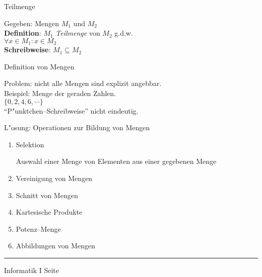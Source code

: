 
\begin{slide}{}
\normalsize
\begin{center}
Teilmenge 
\end{center}
\vspace{0.5cm}

\footnotesize
Gegeben: Mengen $M_1$ und $M_2$ \\[0.3cm]
\textbf{Definition}: $M_1$ \emph{Teilmenge} von $M_2$ g.d.w. \\[0.3cm]
\hspace*{1.3cm} $\forall x \in M_1: x \in M_2$ \\[0.3cm]
\textbf{Schreibweise}: $M_1 \subseteq M_2$


\normalsize
\begin{center}
Definition von Mengen 
\end{center}
\vspace{0.5cm}

\footnotesize
Problem: nicht alle Mengen sind explizit angebbar.  \\
Beispiel: Menge der geraden Zahlen. \\[0.3cm]
\hspace*{1.3cm} $\{0, 2, 4, 6, \cdots \}$ \\[0.3cm]
``P"unktchen--Schreibweise'' nicht eindeutig.

L"osung:  Operationen zur Bildung von Mengen
\begin{enumerate}
\item Selektion 

      Auswahl einer Menge von Elementen aus einer gegebenen Menge
\item Vereinigung von Mengen
\item Schnitt von Mengen
\item Kartesische Produkte
\item Potenz--Menge
\item Abbildungen von Mengen 
\end{enumerate}


\vspace*{\fill}
\tiny \addtocounter{mypage}{1}
\rule{15cm}{1mm}
Informatik I  \hspace*{\fill} Seite 
\end{slide}


